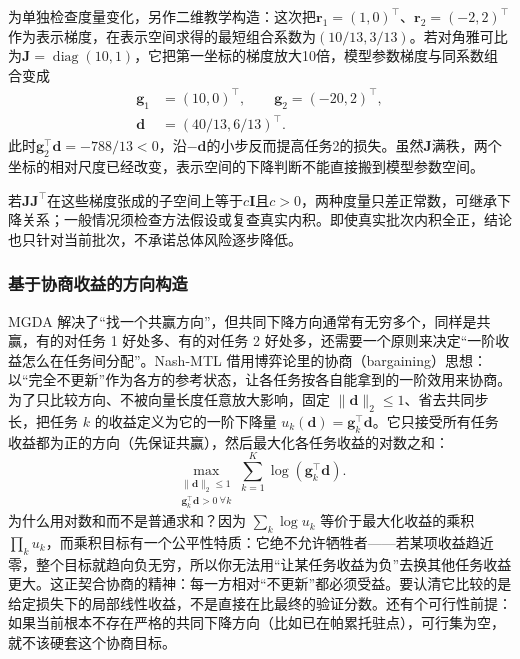 为单独检查度量变化，另作二维教学构造：这次把$\bm r_1=(1,0)^{\top}$、$\bm r_2=(-2,2)^{\top}$作为表示梯度，在表示空间求得的最短组合系数为$(10/13,3/13)$。若对角雅可比为$\bm J=\operatorname{diag}(10,1)$，它把第一坐标的梯度放大10倍，模型参数梯度与同系数组合变成
\[
  \begin{aligned}
    \bm g_1&=(10,0)^{\top},\qquad
    \bm g_2=(-20,2)^{\top},\\
    \bm d&=(40/13,6/13)^{\top}.
  \end{aligned}
\]
此时$\bm g_2^{\top}\bm d=-788/13<0$，沿$-\bm d$的小步反而提高任务2的损失。虽然$\bm J$满秩，两个坐标的相对尺度已经改变，表示空间的下降判断不能直接搬到模型参数空间。

若$\bm J\bm J^{\top}$在这些梯度张成的子空间上等于$c\bm I$且$c>0$，两种度量只差正常数，可继承下降关系；一般情况须检查方法假设或复查真实内积。即使真实批次内积全正，结论也只针对当前批次，不承诺总体风险逐步降低。

\subsubsection{基于协商收益的方向构造}
\label{sec:ket-sharing-nash}

MGDA 解决了“找一个共赢方向”，但共同下降方向通常有无穷多个，同样是共赢，有的对任务 1 好处多、有的对任务 2 好处多，还需要一个原则来决定“一阶收益怎么在任务间分配”。Nash-MTL 借用博弈论里的协商（bargaining）思想：以“完全不更新”作为各方的参考状态，让各任务按各自能拿到的一阶效用来协商。为了只比较方向、不被向量长度任意放大影响，固定 $\|\bm d\|_2\leq1$、省去共同步长，把任务 $k$ 的收益定义为它的一阶下降量 $u_k(\bm d)=\bm g_k^\top\bm d$。它只接受所有任务收益都为正的方向（先保证共赢），然后最大化各任务收益的对数之和：
\begin{equation}
  \max_{\substack{\|\bm d\|_2\leq1\\
                  \bm g_k^{\top}\bm d>0\ \forall k}}
  \sum_{k=1}^{K}\log(\bm g_k^{\top}\bm d).
  \label{eq:ket-sharing-nash-objective}
\end{equation}
为什么用对数和而不是普通求和？因为 $\sum_k\log u_k$ 等价于最大化收益的乘积 $\prod_k u_k$，而乘积目标有一个公平性特质：它绝不允许牺牲者——若某项收益趋近零，整个目标就趋向负无穷，所以你无法用“让某任务收益为负”去换其他任务收益更大。这正契合协商的精神：每一方相对“不更新”都必须受益。要认清它比较的是给定损失下的局部线性收益，不是直接在比最终的验证分数。还有个可行性前提：如果当前根本不存在严格的共同下降方向（比如已在帕累托驻点），可行集为空，就不该硬套这个协商目标。

